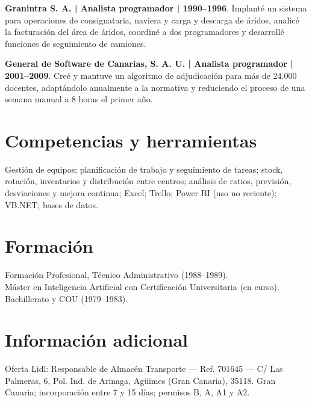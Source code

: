 \documentclass[10pt,a4paper]{article}
\begin{document}
\textbf{Granintra S. A. | Analista programador | 1990–1996}. Implanté un sistema para operaciones de consignataria, naviera y carga y descarga de áridos, analicé la facturación del área de áridos, coordiné a dos programadores y desarrollé funciones de seguimiento de camiones.

\textbf{General de Software de Canarias, S. A. U. | Analista programador | 2001–2009}. Creé y mantuve un algoritmo de adjudicación para más de 24.000 docentes, adaptándolo anualmente a la normativa y reduciendo el proceso de una semana manual a 8 horas el primer año.

\section*{Competencias y herramientas}
Gestión de equipos; planificación de trabajo y seguimiento de tareas; stock, rotación, inventarios y distribución entre centros; análisis de ratios, previsión, desviaciones y mejora continua; Excel; Trello; Power BI (uso no reciente); VB.NET; bases de datos.

\section*{Formación}
Formación Profesional, Técnico Administrativo (1988–1989).\\
Máster en Inteligencia Artificial con Certificación Universitaria (en curso).\\
Bachillerato y COU (1979–1983).

\section*{Información adicional}
Oferta Lidl: Responsable de Almacén Transporte — Ref. 701645 — C/ Las Palmeras, 6, Pol. Ind. de Arinaga, Agüimes (Gran Canaria), 35118. Gran Canaria; incorporación entre 7 y 15 días; permisos B, A, A1 y A2.
\end{document}
